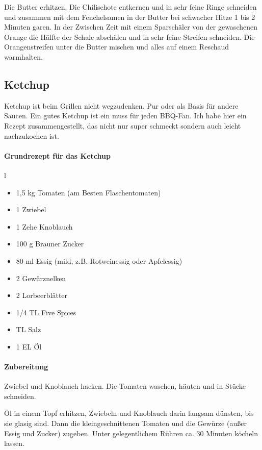 Die Butter erhitzen. Die Chilischote entkernen und in sehr feine Ringe schneiden 
und zusammen 
mit dem Fenchelsamen in der Butter bei 
schwacher Hitze 1 bis 2 Minuten garen. In der Zwischen Zeit mit einem Sparschäler von der 
gewaschenen Orange die Hälfte der Schale 
abschälen und in sehr feine Streifen schneiden. Die Orangenstreifen unter die Butter mischen 
und alles auf einem Reschaud warmhalten.

\subsection{Ketchup}
Ketchup ist beim Grillen nicht wegzudenken. Pur oder als Basis für andere 
Saucen. Ein gutes Ketchup ist ein muss für jeden BBQ-Fan.
Ich habe hier ein Rezept zusammengestellt, das nicht nur super schmeckt 
sondern auch leicht nachzukochen ist. 
\newline

\paragraph{Grundrezept für das Ketchup}\label{Ketchup}l

\begin{itemize}[noitemsep]
	\item 1,5 kg Tomaten (am Besten Flaschentomaten)
	\item 1 Zwiebel
	\item 1 Zehe Knoblauch
	\item 100 g Brauner Zucker
	\item 80 ml Essig (mild, z.B. Rotweinessig oder Apfelessig)
	\item 2 Gewürznelken
	\item 2 Lorbeerblätter
	\item 1/4 TL Five Spices
	\item TL Salz
	\item 1 EL Öl
\end{itemize}

\paragraph{Zubereitung}

Zwiebel und Knoblauch hacken. Die Tomaten waschen, häuten und in Stücke 
schneiden.

Öl in einem Topf erhitzen, Zwiebeln und Knoblauch darin langsam dünsten, bis 
sie glasig sind.
Dann die kleingeschnittenen Tomaten und die Gewürze (außer Essig und 
Zucker) zugeben. Unter gelegentlichem
Rühren ca. 30 Minuten köcheln lassen.

